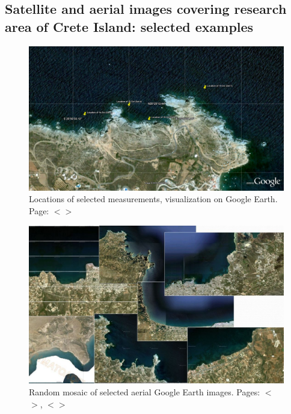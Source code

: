 \documentclass[11pt]{article}
\begin{document}
\begin{appendices}
\pagebreak
\newpage

\subsection{Satellite and aerial images covering research area of Crete Island: selected examples}

\begin{figure}[H]
	\begin{center}
		\includegraphics[scale=0.20]{Locations_Meas.jpg}
		\caption{Locations of selected measurements, visualization on Google Earth­. Page: $<$\pageref{page-47}$>$}\label{fig:A.36}
	\end{center}	
\end{figure}

\begin{figure}[H]
	\begin{center}
		\includegraphics[scale=0.30]{App-8.jpg}
		\caption{Random mosaic of selected aerial Google Earth images. Pages: $<$\pageref{page-30}$>$, $<$\pageref{page-47}$>$}\label{fig:A.37}	
	\end{center}	
\end{figure}
\pagebreak


\end{appendices}
\end{document}
